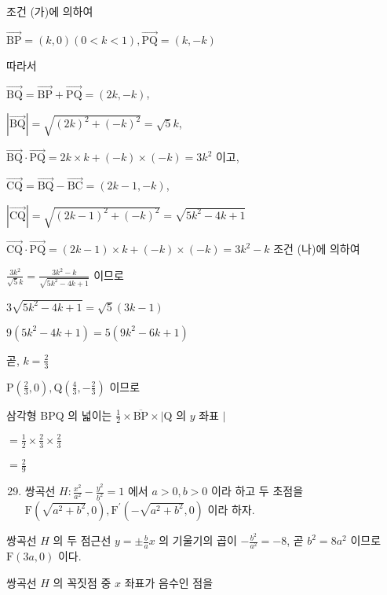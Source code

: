 \documentclass[10pt]{article}
\begin{document}
조건 (가)에 의하여

\(\overrightarrow{\mathrm{BP}}=(k, 0)(0<k<1), \overrightarrow{\mathrm{PQ}}=(k,-k)\)

따라서

\(\overrightarrow{\mathrm{BQ}}=\overrightarrow{\mathrm{BP}}+\overrightarrow{\mathrm{PQ}}=(2 k,-k)\),

\(|\overrightarrow{\mathrm{BQ}}|=\sqrt{(2 k)^{2}+(-k)^{2}}=\sqrt{5} k\),

\(\overrightarrow{\mathrm{BQ}} \cdot \overrightarrow{\mathrm{PQ}}=2 k \times k+(-k) \times(-k)=3 k^{2}\) 이고,

\(\overrightarrow{\mathrm{CQ}}=\overrightarrow{\mathrm{BQ}}-\overrightarrow{\mathrm{BC}}=(2 k-1,-k)\),

\(|\overrightarrow{\mathrm{CQ}}|=\sqrt{(2 k-1)^{2}+(-k)^{2}}=\sqrt{5 k^{2}-4 k+1}\)

\(\overrightarrow{\mathrm{CQ}} \cdot \overrightarrow{\mathrm{PQ}}=(2 k-1) \times k+(-k) \times(-k)=3 k^{2}-k\) 조건 (나)에 의하여

\(\frac{3 k^{2}}{\sqrt{5} k}=\frac{3 k^{2}-k}{\sqrt{5 k^{2}-4 k+1}}\) 이므로

\(3 \sqrt{5 k^{2}-4 k+1}=\sqrt{5}(3 k-1)\)

\(9\left(5 k^{2}-4 k+1\right)=5\left(9 k^{2}-6 k+1\right)\)

곧, \(k=\frac{2}{3}\)

\(\mathrm{P}\left(\frac{2}{3}, 0\right), \mathrm{Q}\left(\frac{4}{3},-\frac{2}{3}\right)\) 이므로

삼각형 BPQ 의 넓이는 \(\frac{1}{2} \times \overline{\mathrm{BP}} \times \mid \mathrm{Q}\) 의 \(y\) 좌표 \(\mid\)

\(=\frac{1}{2} \times \frac{2}{3} \times \frac{2}{3}\)

\(=\frac{2}{9}\)

\begin{enumerate}
  \setcounter{enumi}{28}
  \item 쌍곡선 \(H: \frac{x^{2}}{a^{2}}-\frac{y^{2}}{b^{2}}=1\) 에서 \(a>0, b>0\) 이라 하고 두 초점을 \(\mathrm{F}\left(\sqrt{a^{2}+b^{2}}, 0\right), \mathrm{F}^{\prime}\left(-\sqrt{a^{2}+b^{2}}, 0\right)\) 이라 하자.
\end{enumerate}

쌍곡선 \(H\) 의 두 점근선 \(y= \pm \frac{b}{a} x\) 의 기울기의 곱이 \(-\frac{b^{2}}{a^{2}}=-8\), 곧 \(b^{2}=8 a^{2}\) 이므로 \(\mathrm{F}(3 a, 0)\) 이다.

쌍곡선 \(H\) 의 꼭짓점 중 \(x\) 좌표가 음수인 점을
\end{document}
